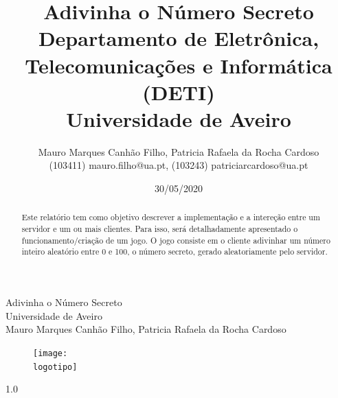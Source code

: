 \documentclass{report}
\begin{document}
%
\def\titulo{Adivinha o Número Secreto}
\def\data{30/05/2020}
\def\autores{Mauro Marques Canhão Filho, Patricia Rafaela da Rocha Cardoso }
\def\autorescontactos{(103411) mauro.filho@ua.pt, (103243) patriciarcardoso@ua.pt}
\def\versao{1.0}
\def\departamento{Departamento de Eletrônica, Telecomunicações e Informática (DETI)}
\def\empresa{Universidade de Aveiro}
\def\logotipo{ua.pdf}
%
%
\renewcommand{\contentsname}{Índice}
\begin{titlepage}

\begin{center}
%
\vspace*{50mm}
%
{\Huge \titulo}\\ 
%
\vspace{10mm}
%
{\Large \empresa}\\
%
\vspace{10mm}
%
{\LARGE \autores}\\ 
%
\vspace{30mm}
%
\begin{figure}[h]
\center
\texttt{[image: \\logotipo]}
\end{figure}
%
\vspace{30mm}
\end{center}
%
\begin{flushright}
\versao
\end{flushright}
\end{titlepage}

\title{%
{\Huge\textbf{\titulo}}\\
{\Large \departamento\\ \empresa}
}
%
\author{%
    \autores \\
    \autorescontactos
}
%
\date{\data}
%
\maketitle


\begin{abstract}
Este relatório tem como objetivo descrever a implementação e a intereção entre um servidor e um ou mais clientes. Para isso, será detalhadamente apresentado o funcionamento/criação de um jogo. O jogo consiste em o cliente adivinhar um número inteiro aleatório entre 0 e 100, o número secreto, gerado aleatoriamente pelo servidor.
\end{abstract}
\end{document}

